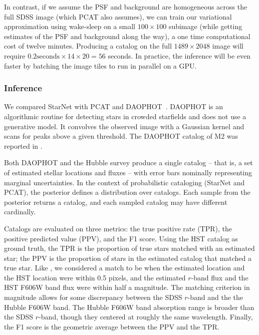 In contrast, if we assume the PSF and background are homogeneous 
across the full SDSS image (which PCAT also assumes), we can 
train our variational approximation using wake-sleep 
on a small $100 \times 100$ subimage
(while getting estimates of the PSF and background along the way),
a one time computational cost of twelve minutes. 
Producing a catalog on the full $1489 \times 2048$ image will require 
$0.2\text{seconds} \times 14 \times 20 = 56$ seconds. In practice, 
the inference will be even faster by batching the image tiles to run in parallel on a GPU. 



\subsubsection{Inference}
\label{sec:m2_results}
We compared StarNet with PCAT and DAOPHOT~\cite{stetson2987daophot}. 
DAOPHOT is an algorithmic routine for detecting stars in crowded starfields and does not use a generative model. 
It convolves the observed image with a Gaussian kernel and scans for peaks above a given threshold. 
The DAOPHOT catalog of M2 was reported in 
\cite{An_2008_m2}. 

Both DAOPHOT and the Hubble survey produce a single catalog -- that is, a set of estimated stellar locations and fluxes -- with
error bars nominally representing marginal uncertainties.
In the context of probabilistic cataloging (StarNet and PCAT), the posterior 
defines a distribution over catalogs.
Each sample from the posterior returns a catalog, and each 
sampled catalog may have different cardinally. 

Catalogs are evaluated on three metrics: the true positive rate (TPR), the positive predicted value (PPV), and the F1 score. Using the HST catalog as ground truth, the TPR is the proportion of true stars matched with an estimated star;
the PPV is the proportion of stars in the estimated catalog that matched a true star. Like \cite{Portillo_2017, Feder_2019}, we considered a match to be when the estimated location and the HST location were within 0.5 pixels,
and the estimated $r$-band flux and the HST F606W band flux were within half a
magnitude. 
The matching criterion in magnitude allows for some discrepancy between the SDSS $r$-band and the the Hubble F606W band. 
The Hubble F606W band absorption range is broader than the SDSS $r$-band, though they centered at roughly the same wavelength. Finally, the F1 score is the geometric average between the PPV and the TPR. 

